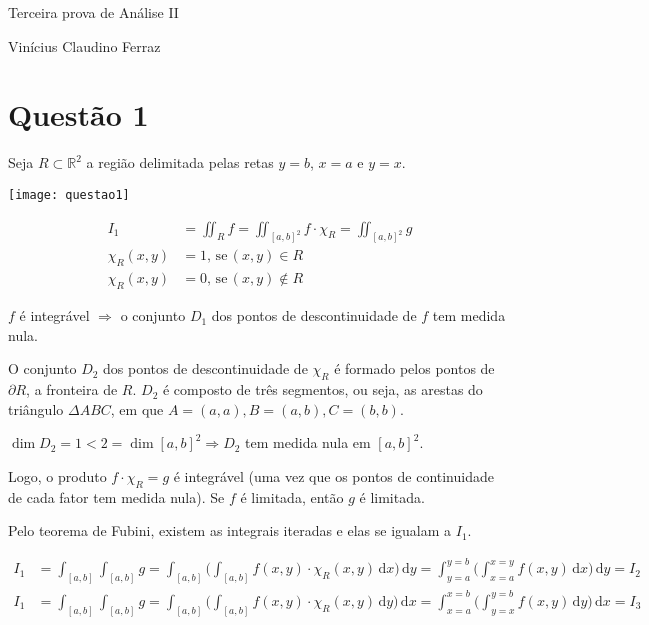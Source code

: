 \documentclass[12pt,a4paper]{article}
\date{}
\begin{document}
	\Large
	
	\begin{center}
		Terceira prova de An\'alise II
	
		Vin\'icius Claudino Ferraz
	\end{center}
	
	\normalsize

	\section{Quest\~ao 1}
		\begin{flushright}
		\end{flushright}

		Seja $R \subset \mathbb{R}^2$ a regi\~ao delimitada pelas retas $y = b$, $x = a$ e $y = x$.

		\begin{center}
		\texttt{[image: questao1]}
		\end{center}
	
		\begin{align}
				I_1 &= \iint_R f = \iint_{[a, b]^2} f \cdot \chi_R = \iint_{[a, b]^2} g \\
				\chi_R(x, y) &= 1, \mathrm{\,se\,} (x, y) \in R \\
				\chi_R(x, y) &= 0, \mathrm{\,se\,} (x, y) \notin R
		\end{align}
		
		$f$ \'e integr\'avel $\Rightarrow$ o conjunto $D_1$ dos pontos de descontinuidade de $f$ tem medida nula.
		
		O conjunto $D_2$ dos pontos de descontinuidade de $\chi_R$ \'e formado pelos pontos de $\partial R$, a fronteira de $R$. $D_2$ \'e composto de tr\^es segmentos, ou seja, as arestas do tri\^angulo $\Delta ABC$, em que $A = (a, a), B = (a, b), C = (b, b)$.
		
		$\dim D_2 = 1 < 2 = \dim [a, b]^2 \Rightarrow D_2$ tem medida nula em $[a,b]^2$. 
		
		Logo, o produto $f \cdot \chi_R = g$ \'e integr\'avel (uma vez que os pontos de continuidade de cada fator tem medida nula). Se $f$ \'e limitada, ent\~ao $g$ \'e limitada.
		
		Pelo teorema de Fubini, existem as integrais iteradas e elas se igualam a $I_1$.		
		
		\begin{align}
				I_1 &= \int_{[a,b]} \int_{[a,b]} g = \int_{[a,b]} \biggl( \int_{[a,b]} f(x,y) \cdot \chi_R(x,y) \,\mathrm{d}x \biggl) \,\mathrm{d}y  = \int_{y = a}^{y = b} \biggl( \int_{x = a}^{x = y} f(x,y) \,\mathrm{d}x \biggl) \,\mathrm{d}y = I_2 \\
				I_1 &= \int_{[a,b]} \int_{[a,b]} g = \int_{[a,b]} \biggl( \int_{[a,b]} f(x,y) \cdot \chi_R(x,y) \,\mathrm{d}y \biggl) \,\mathrm{d}x  = \int_{x = a}^{x = b} \biggl( \int_{y = x}^{y = b} f(x,y) \,\mathrm{d}y \biggl) \,\mathrm{d}x = I_3
		\end{align}
		
\end{document}
